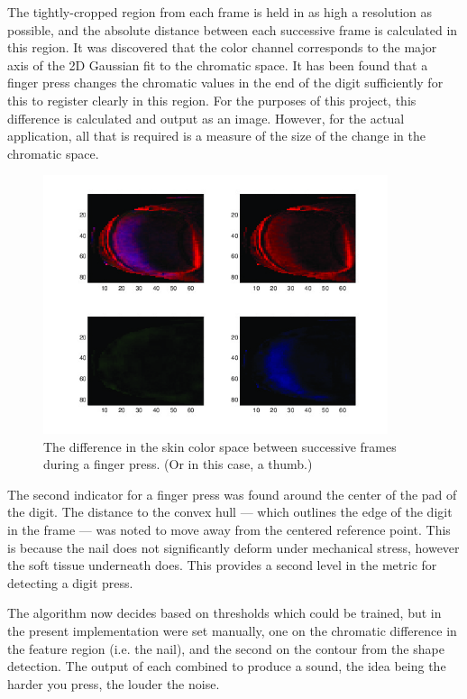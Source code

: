 The tightly-cropped region from each frame is held in as high a resolution as possible, and the absolute distance between each successive frame is calculated in this region. It was discovered that the color channel corresponds to the major axis of the 2D Gaussian fit to the chromatic space. It has been found that a finger press changes the chromatic values in the end of the digit sufficiently for this to register clearly in this region. For the purposes of this project, this difference is calculated and output as an image. However, for the actual application, all that is required is a measure of the size of the change in the chromatic space.

\begin{figure}[h!]
  \centering
    \includegraphics[width=0.90\textwidth]{Chapter4/Figs/jThumb_Final_Proof.jpg}
    \caption{The difference in the skin color space between successive frames during a finger press. (Or in this case, a thumb.)}\label{fig:FinalProof}
\end{figure}

The second indicator for a finger press was found around the center of the pad of the digit. The distance to the convex hull --- which outlines the edge of the digit in the frame --- was noted to move away from the centered reference point. This is because the nail does not significantly deform under mechanical stress, however the soft tissue underneath does. This provides a second level in the metric for detecting a digit press.

The algorithm now decides based on thresholds which could be trained, but in the present implementation were set manually, one on the chromatic difference in the feature region (i.e. the nail), and the second on the contour from the shape detection. The output of each combined to produce a sound, the idea being the harder you press, the louder the noise.

